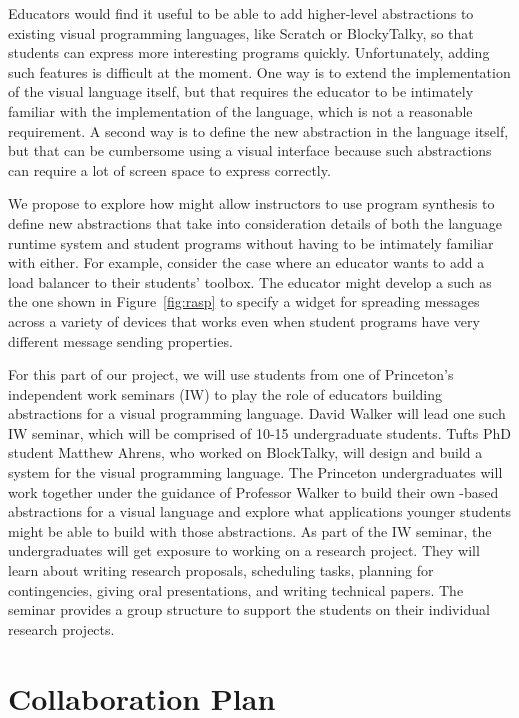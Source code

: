 Educators would find it useful to be able to add higher-level abstractions
to existing visual programming languages, like Scratch or BlockyTalky,
so that students can express more interesting programs quickly.
Unfortunately, adding such features is
difficult at the moment\cite{ScratchExt}. One way is to extend the implementation of
the visual language itself, but that requires the educator to be
intimately familiar with the implementation of the language, which is
not a reasonable requirement.  A second way is to define the new
abstraction in the language itself, but that can be cumbersome using a
visual interface because such abstractions can require a lot of screen
space to express correctly.

We propose to explore how \rasps might allow instructors to use
program synthesis to define new abstractions that take into
consideration details of both the language runtime system and student
programs without having to be intimately familiar with either.  For
example, consider the case where an educator wants to add a load
balancer to their students' toolbox.  The educator might develop a
\rasp such as the one shown in Figure~\ref{fig:rasp} to specify a
widget for spreading messages across a variety of devices that works
even when student programs have very different message sending
properties.

For this part of our project, we will use students from one of
Princeton's independent work seminars (IW) to play the role of
educators building abstractions for a visual programming language.
David Walker will lead one such IW seminar, which will be comprised of 10-15
undergraduate students.  Tufts PhD student Matthew Ahrens, who worked
on BlockTalky, will design and build a \rasp system for the visual
programming language.  The Princeton undergraduates will work together
under the guidance of Professor Walker to build their own \rasp-based
abstractions for a visual language and explore what applications
younger students might be able to build with those abstractions.
As part of the IW seminar, the undergraduates will get exposure to
working on a research project.  They will learn about writing research
proposals, scheduling tasks, planning for contingencies, giving oral
presentations, and writing technical papers.  The seminar provides a
group structure to support the students on their individual research projects.

\section{Collaboration Plan}

